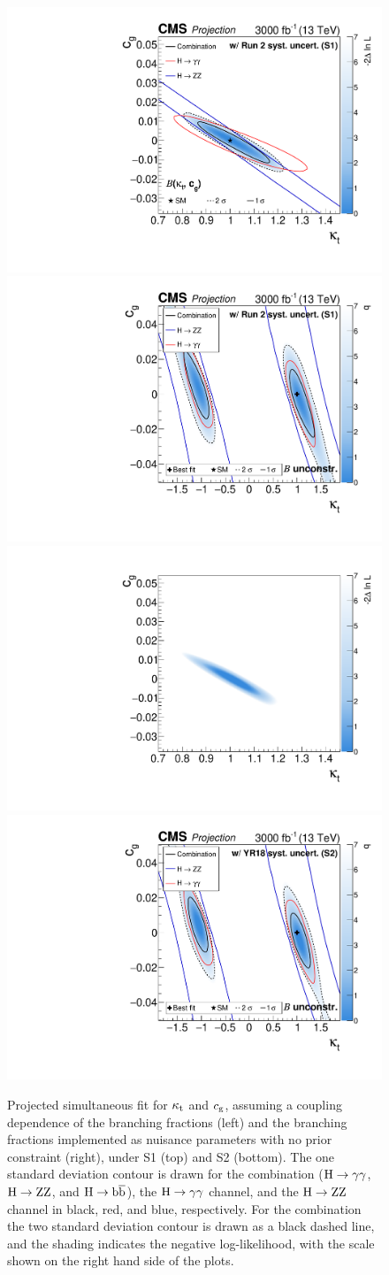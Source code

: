 \begin{figure}[hbtp]
\begin{center}
{        }{
        \includegraphics[width=0.49\linewidth]{img/projections/projection_ktcg_plot_couplingdependentBRs.pdf}
        \includegraphics[width=0.49\linewidth]{img/projections/projection_ktcg_plot_floatingBRs.pdf}
        \includegraphics[width=0.49\linewidth]{img/projections/projection_ktcg_plot_couplingdependentBRs_scenario2.pdf}
        \includegraphics[width=0.49\linewidth]{img/projections/projection_ktcg_plot_floatingBRs_scenario2.pdf}
        }
    \caption{
        Projected simultaneous fit for $\kappa_{\mathrm{t}}$ and $c_\mathrm{g}$, assuming a coupling dependence of the branching fractions (left) and the branching fractions implemented as nuisance parameters with no prior constraint (right), under S1 (top) and S2 (bottom).
        The one standard deviation contour is drawn for the combination ($\mathrm{H}\to\mathrm{\gamma}\mathrm{\gamma}$, $\mathrm{H}\to\mathrm{Z}\mathrm{Z}$, and $\mathrm{H}\to\mathrm{b}\overline{\mathrm{b}}$), the $\mathrm{H}\to\mathrm{\gamma}\mathrm{\gamma}$ channel, and the $\mathrm{H}\to\mathrm{Z}\mathrm{Z}$ channel in black, red, and blue, respectively.
        For the combination the two standard deviation contour is drawn as a black dashed line, and the shading indicates the negative log-likelihood, with the scale shown on the right hand side of the plots.
        }
    \label{fig:proj_ktcg}
  \end{center}
\end{figure}

